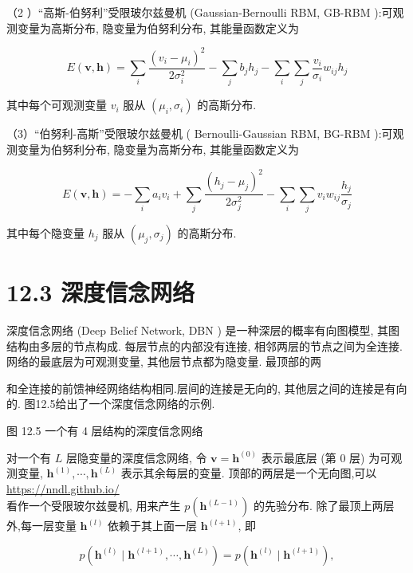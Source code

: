 \documentclass[10pt]{article}
\begin{document}
（2 ）“高斯-伯努利”受限玻尔兹曼机 (Gaussian-Bernoulli RBM, GB-RBM ):可观测变量为高斯分布, 隐变量为伯努利分布, 其能量函数定义为


\begin{equation*}
E(\boldsymbol{v}, \boldsymbol{h})=\sum_{i} \frac{\left(v_{i}-\mu_{i}\right)^{2}}{2 \sigma_{i}^{2}}-\sum_{j} b_{j} h_{j}-\sum_{i} \sum_{j} \frac{v_{i}}{\sigma_{i}} w_{i j} h_{j} \tag{12.57}
\end{equation*}


其中每个可观测变量 $v_{i}$ 服从 $\left(\mu_{i}, \sigma_{i}\right)$ 的高斯分布.

（3）“伯努利-高斯”受限玻尔兹曼机 ( Bernoulli-Gaussian RBM, BG-RBM ):可观测变量为伯努利分布, 隐变量为高斯分布, 其能量函数定义为


\begin{equation*}
E(\boldsymbol{v}, \boldsymbol{h})=-\sum_{i} a_{i} v_{i}+\sum_{j} \frac{\left(h_{j}-\mu_{j}\right)^{2}}{2 \sigma_{j}^{2}}-\sum_{i} \sum_{j} v_{i} w_{i j} \frac{h_{j}}{\sigma_{j}} \tag{12.58}
\end{equation*}


其中每个隐变量 $h_{j}$ 服从 $\left(\mu_{j}, \sigma_{j}\right)$ 的高斯分布.

\section*{12.3 深度信念网络}
深度信念网络 (Deep Belief Network, DBN ) 是一种深层的概率有向图模型, 其图结构由多层的节点构成. 每层节点的内部没有连接, 相邻两层的节点之间为全连接. 网络的最底层为可观测变量, 其他层节点都为隐变量. 最顶部的两

和全连接的前馈神经网络结构相同.层间的连接是无向的, 其他层之间的连接是有向的. 图12.5给出了一个深度信念网络的示例.



图 12.5 一个有 4 层结构的深度信念网络

对一个有 $L$ 层隐变量的深度信念网络, 令 $\boldsymbol{v}=\boldsymbol{h}^{(0)}$ 表示最底层 (第 0 层) 为可观测变量, $\boldsymbol{h}^{(1)}, \cdots, \boldsymbol{h}^{(L)}$ 表示其余每层的变量. 顶部的两层是一个无向图,可以 \href{https://nndl.github.io/}{https://nndl.github.io/}\\
看作一个受限玻尔兹曼机, 用来产生 $p\left(\boldsymbol{h}^{(L-1)}\right)$ 的先验分布. 除了最顶上两层外,每一层变量 $\boldsymbol{h}^{(l)}$ 依赖于其上面一层 $\boldsymbol{h}^{(l+1)}$, 即


\begin{equation*}
p\left(\boldsymbol{h}^{(l)} \mid \boldsymbol{h}^{(l+1)}, \cdots, \boldsymbol{h}^{(L)}\right)=p\left(\boldsymbol{h}^{(l)} \mid \boldsymbol{h}^{(l+1)}\right), \tag{12.59}
\end{equation*}
\end{document}
